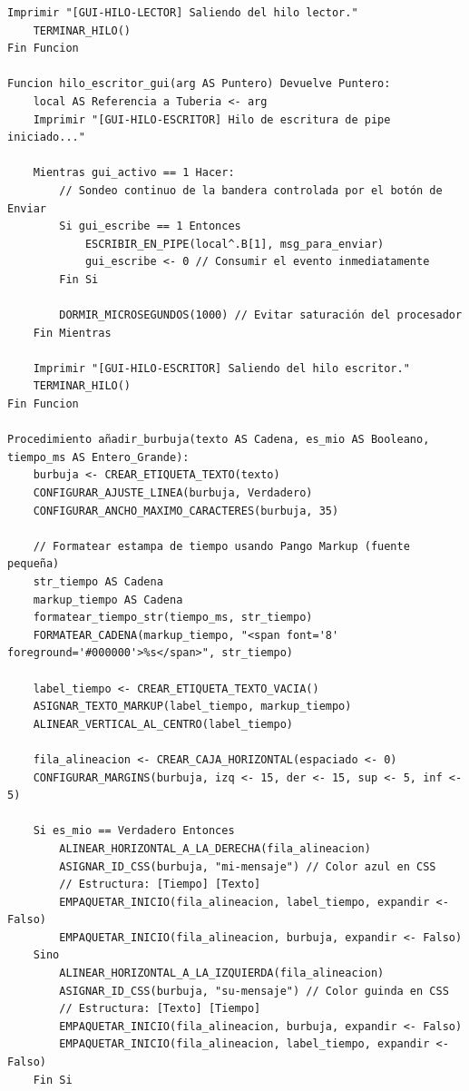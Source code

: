 \begin{lstlisting}[style=estiloPseudo]
    Imprimir "[GUI-HILO-LECTOR] Saliendo del hilo lector."
    TERMINAR_HILO()
Fin Funcion

Funcion hilo_escritor_gui(arg AS Puntero) Devuelve Puntero:
    local AS Referencia a Tuberia <- arg
    Imprimir "[GUI-HILO-ESCRITOR] Hilo de escritura de pipe iniciado..."

    Mientras gui_activo == 1 Hacer:
        // Sondeo continuo de la bandera controlada por el botón de Enviar
        Si gui_escribe == 1 Entonces
            ESCRIBIR_EN_PIPE(local^.B[1], msg_para_enviar)
            gui_escribe <- 0 // Consumir el evento inmediatamente
        Fin Si
        
        DORMIR_MICROSEGUNDOS(1000) // Evitar saturación del procesador
    Fin Mientras

    Imprimir "[GUI-HILO-ESCRITOR] Saliendo del hilo escritor."
    TERMINAR_HILO()
Fin Funcion

Procedimiento añadir_burbuja(texto AS Cadena, es_mio AS Booleano, tiempo_ms AS Entero_Grande):
    burbuja <- CREAR_ETIQUETA_TEXTO(texto)
    CONFIGURAR_AJUSTE_LINEA(burbuja, Verdadero)
    CONFIGURAR_ANCHO_MAXIMO_CARACTERES(burbuja, 35)

    // Formatear estampa de tiempo usando Pango Markup (fuente pequeña)
    str_tiempo AS Cadena
    markup_tiempo AS Cadena
    formatear_tiempo_str(tiempo_ms, str_tiempo)
    FORMATEAR_CADENA(markup_tiempo, "<span font='8' foreground='#000000'>%s</span>", str_tiempo)
    
    label_tiempo <- CREAR_ETIQUETA_TEXTO_VACIA()
    ASIGNAR_TEXTO_MARKUP(label_tiempo, markup_tiempo)
    ALINEAR_VERTICAL_AL_CENTRO(label_tiempo)

    fila_alineacion <- CREAR_CAJA_HORIZONTAL(espaciado <- 0)
    CONFIGURAR_MARGINS(burbuja, izq <- 15, der <- 15, sup <- 5, inf <- 5)

    Si es_mio == Verdadero Entonces
        ALINEAR_HORIZONTAL_A_LA_DERECHA(fila_alineacion)
        ASIGNAR_ID_CSS(burbuja, "mi-mensaje") // Color azul en CSS
        // Estructura: [Tiempo] [Texto]
        EMPAQUETAR_INICIO(fila_alineacion, label_tiempo, expandir <- Falso)
        EMPAQUETAR_INICIO(fila_alineacion, burbuja, expandir <- Falso)
    Sino
        ALINEAR_HORIZONTAL_A_LA_IZQUIERDA(fila_alineacion)
        ASIGNAR_ID_CSS(burbuja, "su-mensaje") // Color guinda en CSS
        // Estructura: [Texto] [Tiempo]
        EMPAQUETAR_INICIO(fila_alineacion, burbuja, expandir <- Falso)
        EMPAQUETAR_INICIO(fila_alineacion, label_tiempo, expandir <- Falso)
    Fin Si


\end{lstlisting}
